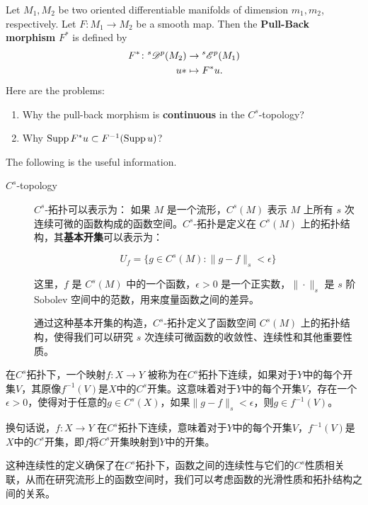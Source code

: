 \documentclass[lang=cn,zihao=-4,a4paper,fontset=none]{beautybook}
\begin{document}
\begin{problem}
    Let $M_1,M_2$ be two oriented differentiable manifolds of dimension $m_1,m_2$, respectively. Let $F\colon M_1\to M_2$ be a smooth map. Then the \textbf{Pull-Back morphism} $F^*$ is defined by 
    \[
        \begin{aligned}
                    F^* \colon {}^s {\mathscr D}^p(M_2) &\to {}^s{\mathscr E}^p(M_1)\\ 
                    u* &\mapsto F^* u.
        \end{aligned}
    \]
    Here are the problems: 
    \begin{enumerate}
        \item     Why the pull-back morphism is \textbf{continuous} in the $C^s$-topology? 
        \item Why $\operatorname{Supp} F^* u\subset F^{-1}(\operatorname{Supp} u)$?
    \end{enumerate}
\tcblower
The following is the useful information. 
\begin{description}
    \item[$C^s$-topology] $C^s$-拓扑可以表示为：
    如果 $M$ 是一个流形，$C^s(M)$ 表示 $M$ 上所有 $s$ 次连续可微的函数构成的函数空间。$C^s$-拓扑是定义在 $C^s(M)$ 上的拓扑结构，其\textbf{基本开集}可以表示为：
    
    $$ U_f = \{ g \in C^s(M) : \| g - f \|_s < \epsilon \} $$
    
    这里，$f$ 是 $C^s(M)$ 中的一个函数，$\epsilon > 0$ 是一个正实数，$\| \cdot \|_s$ 是 $s$ 阶 Sobolev 空间中的范数，用来度量函数之间的差异。
    
    通过这种基本开集的构造，$C^s$-拓扑定义了函数空间 $C^s(M)$ 上的拓扑结构，使得我们可以研究 $s$ 次连续可微函数的收敛性、连续性和其他重要性质。
\end{description}
在$C^s$拓扑下，一个映射$f: X \to Y$ 被称为在$C^s$拓扑下连续，如果对于$Y$中的每个开集$V$，其原像$f^{-1}(V)$是$X$中的$C^s$开集。这意味着对于$Y$中的每个开集$V$，存在一个$\epsilon > 0$，使得对于任意的$g \in C^s(X)$，如果$\| g - f \|_s < \epsilon$，则$g \in f^{-1}(V)$。

换句话说，$f: X \to Y$ 在$C^s$拓扑下连续，意味着对于$Y$中的每个开集$V$，$f^{-1}(V)$是$X$中的$C^s$开集，即$f$将$C^s$开集映射到$Y$中的开集。

这种连续性的定义确保了在$C^s$拓扑下，函数之间的连续性与它们的$C^s$性质相关联，从而在研究流形上的函数空间时，我们可以考虑函数的光滑性质和拓扑结构之间的关系。
\end{problem}
    
\end{document}
